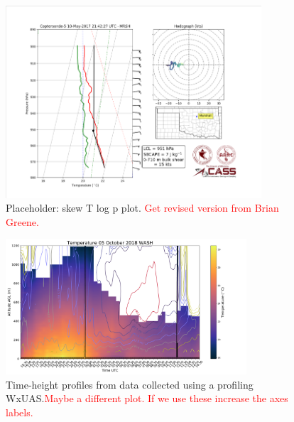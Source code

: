 \documentclass[sensors,review,submit,moreauthors,pdftex,10pt,a4paper]{mdpi}
\theoremstyle{mdpi}
\newcounter{ex}
\newcounter{re}
\theoremstyle{mdpidefinition}
\begin{document}
\begin{figure}
\centering
\includegraphics[angle=0, width=0.85\textwidth]{figures/skewT.pdf}
\caption{\label{fig:skewT_logp} Placeholder: skew T log p plot. \textcolor{red}{Get revised version from Brian Greene.}}
\end{figure}

\begin{figure}[htb]
\centering
\includegraphics[angle=0, width=0.8\textwidth]{figures/WASH_fluxcap_uas_temp_vad_color.pdf}
\caption{\label{fig:TimeHeightPlot} Time-height profiles from data collected using a profiling WxUAS.\textcolor{red}{Maybe a different plot. If we use these increase the axes labels.}}
\end{figure}
\end{document}
